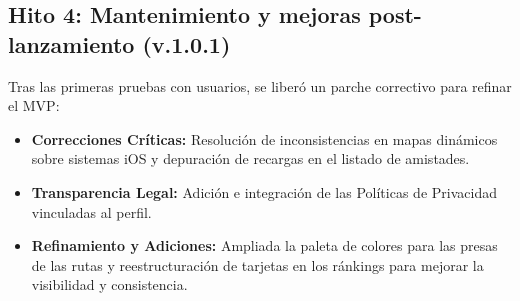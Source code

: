 \subsection{Hito 4: Mantenimiento y mejoras post-lanzamiento (v.1.0.1)}
Tras las primeras pruebas con usuarios, se liberó un parche correctivo para refinar el MVP:
\begin{itemize}
    \item \textbf{Correcciones Críticas:} Resolución de inconsistencias en mapas dinámicos sobre sistemas iOS y depuración de recargas en el listado de amistades.
    \item \textbf{Transparencia Legal:} Adición e integración de las Políticas de Privacidad vinculadas al perfil.
    \item \textbf{Refinamiento y Adiciones:} Ampliada la paleta de colores para las presas de las rutas y reestructuración de tarjetas en los ránkings para mejorar la visibilidad y consistencia.
\end{itemize}